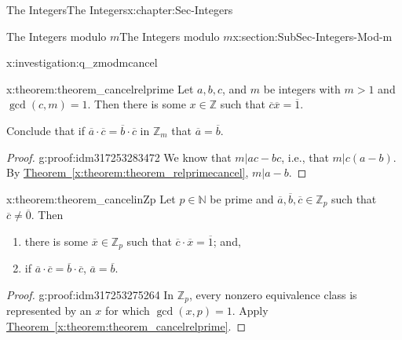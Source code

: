 \documentclass[oneside,10pt,]{book}
\newcommand{\xreffont}{\relax}
\numberwithin{equation}{section}
\def\Z{{\mathbb Z}}
\def\N{{\mathbb N}}
\begin{document}
\begin{chapterptx}{The Integers}{}{The Integers}{}{}{x:chapter:Sec-Integers}
\begin{sectionptx}{The Integers modulo \(m\)}{}{The Integers modulo \(m\)}{}{}{x:section:SubSec-Integers-Mod-m}
\begin{investigation}{}{x:investigation:q_zmodmcancel}
\end{investigation}
\begin{theorem}{}{}{x:theorem:theorem_cancelrelprime}%
Let \(a,b,c\), and \(m\) be integers with \(m > 1\) and \(\gcd(c,m)=1\). Then there is some \(x\in \Z\) such that \(\overline{c} \overline{x} = \overline{1}\).%
\par
Conclude that if \(\overline{a} \cdot\overline{c} = \overline{b}\cdot\overline{c}\) in \(\Z_m\) that \(\overline{a} = \overline{b}\).%
\end{theorem}
\begin{proof}{}{g:proof:idm317253283472}
We know that \(m|ac-bc\), i.e., that \(m|c(a-b)\). By \hyperref[x:theorem:theorem_relprimecancel]{Theorem~{\xreffont\ref{x:theorem:theorem_relprimecancel}}}, \(m|a-b\).%
\end{proof}
\begin{theorem}{}{}{x:theorem:theorem_cancelinZp}%
Let \(p\in \N\) be prime and \(\overline{a},\overline{b},\overline{c}\in \Z_p\) such that \(\overline{c}\ne \overline{0}\). Then%
\begin{enumerate}
\item{}there is some \(\overline{x}\in \Z_p\) such that \(\overline{c}\cdot \overline{x} = \overline{1}\); and,%
\item{}if \(\overline{a} \cdot\overline{c} = \overline{b}\cdot\overline{c}\), \(\overline{a} = \overline{b}\).%
\end{enumerate}
%
\end{theorem}
\begin{proof}{}{g:proof:idm317253275264}
In \(\Z_p\), every nonzero equivalence class is represented by an \(x\) for which \(\gcd(x,p) = 1\). Apply \hyperref[x:theorem:theorem_cancelrelprime]{Theorem~{\xreffont\ref{x:theorem:theorem_cancelrelprime}}}.%
\end{proof}
\end{sectionptx}
\end{chapterptx}
%
%
\typeout{************************************************}
\typeout{************************************************}
%
\end{document}
